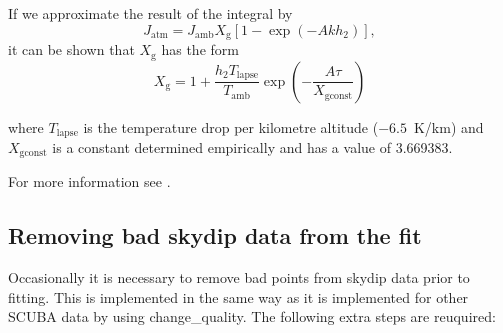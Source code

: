 \documentclass[twoside,11pt]{article}
\newcommand{\task}[1]{{\sf #1}}
\newcommand{\chgqual}{\htmlref{\task{change\_quality}}{CHANGE_QUALITY}}
\newcommand{\htmlref}[2]{#1}
\begin{document}
If we approximate the result of the integral by 
\begin{equation}
J_\mathrm{atm} = J_\mathrm{amb} X_\mathrm{g} \left[1-\exp\left(-A k h_2\right)\right],
\end{equation}
it can be shown that $X_\mathrm{g}$ has the form
\begin{equation}
X_\mathrm{g} = 1 + \frac{h_2 T_\mathrm{lapse}}{T_\mathrm{amb}}\exp\left(-\frac{A \tau}{X_\mathrm{gconst}}\right)
\end{equation}

where $T_\mathrm{lapse}$ is the temperature drop per kilometre altitude
($-6.5$~K/km) and $X_\mathrm{gconst}$ is a constant determined empirically and
has a value of 3.669383.

For more information see \cite{skydip}.

\subsection{Removing bad skydip data from the fit}
\label{skydips_eg}

Occasionally it is necessary to remove bad points from skydip data prior to
fitting. This is implemented in the same way as it is implemented for 
other SCUBA data by using \chgqual. The following extra steps are reuquired:
\end{document}
